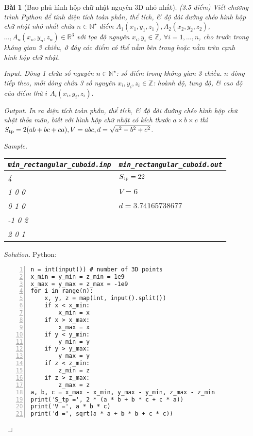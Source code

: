 \documentclass{article}
\newtheorem{baitoan}{Bài}
\begin{document}
\begin{baitoan}[Bao phủ hình hộp chữ nhật nguyên 3D nhỏ nhất]
	{\rm(3.5 điểm)} Viết chương trình Python để tính diện tích toàn phần, thể tích, \& độ dài đường chéo hình hộp chữ nhật nhỏ nhất chứa $n\in\mathbb{N}^\star$ điểm $A_1(x_1,y_1,z_1),A_2(x_2,y_2,z_2)$, $\ldots,A_n(x_n,y_n,z_n)\in\mathbb{R}^3$ với tọa độ nguyên $x_i,y_i\in\mathbb{Z}$, $\forall i = 1,\ldots,n$, cho trước trong không gian 3 chiều, ở đây các điểm có thể nằm bên trong hoặc nằm trên cạnh hình hộp chữ nhật.
	\item {\sf Input.} Dòng 1 chứa số nguyên $n\in\mathbb{N}^\star$: số điểm trong không gian 3 chiều. $n$ dòng tiếp theo, mỗi dòng chứa 3 số nguyên $x_i,y_i,z_i\in\mathbb{Z}$: hoành độ, tung độ, \& cao độ của điểm thứ $i$ $A_i(x_i,y_i,z_i)$.
	\item {\sf Output.} In ra diện tích toàn phần, thể tích, \& độ dài đường chéo hình hộp chữ nhật thỏa mãn, biết với hình hộp chữ nhật có kích thước $a\times b\times c$ thì $S_{\rm tp} = 2(ab + bc + ca),V = abc,d = \sqrt{a^2 + b^2 + c^2}$.
	\item {\sf Sample.}
	\begin{table}[H]
		\centering
		\begin{tabular}{|l|l|}
			\hline
			\verb|min_rectangular_cuboid.inp| & \verb|min_rectangular_cuboid.out| \\
			\hline
			4 & $S_{\rm tp} = 22$ \\
			1 0 0& $V = 6$ \\
			0 1 0 & $d = 3.74165738677 $ \\
			-1 0 2 & \\
			2 0 1 & \\
			\hline
		\end{tabular}
	\end{table}
\end{baitoan}

\begin{proof}[Solution]
    Python:
    \begin{Verbatim}[numbers=left,xleftmargin=5mm]
n = int(input()) # number of 3D points
x_min = y_min = z_min = 1e9
x_max = y_max = z_max = -1e9
for i in range(n):
    x, y, z = map(int, input().split())
    if x < x_min:
        x_min = x
    if x > x_max:
        x_max = x
    if y < y_min:
        y_min = y
    if y > y_max:
        y_max = y
    if z < z_min:
        z_min = z
    if z > z_max:
        z_max = z
a, b, c = x_max - x_min, y_max - y_min, z_max - z_min
print('S_tp =', 2 * (a * b + b * c + c * a))
print('V =', a * b * c)
print('d =', sqrt(a * a + b * b + c * c))
    \end{Verbatim}
\end{proof}


\printbibliography[heading=bibintoc]
	
\end{document}
